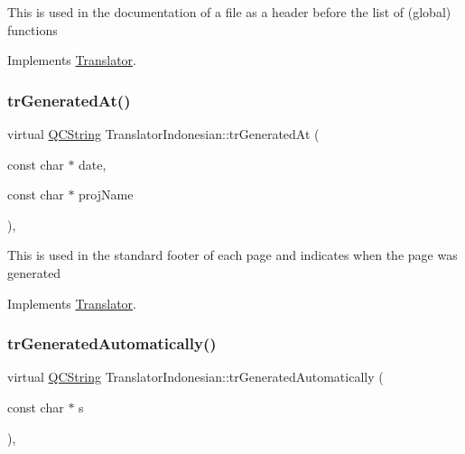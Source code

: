 This is used in the documentation of a file as a header before the list of (global) functions 

Implements \mbox{\hyperlink{class_translator}{Translator}}.

\mbox{\label{class_translator_indonesian_a027dd25383d2af18baa383e7cd5f08ab}} 
\subsubsection{\texorpdfstring{trGeneratedAt()}{trGeneratedAt()}}
{\footnotesize\ttfamily virtual \mbox{\hyperlink{class_q_c_string}{Q\+C\+String}} Translator\+Indonesian\+::tr\+Generated\+At (\begin{DoxyParamCaption}\item[{const char $\ast$}]{date,  }\item[{const char $\ast$}]{proj\+Name }\end{DoxyParamCaption})\hspace{0.3cm}{\ttfamily [inline]}, {\ttfamily [virtual]}}

This is used in the standard footer of each page and indicates when the page was generated 

Implements \mbox{\hyperlink{class_translator}{Translator}}.

\mbox{\label{class_translator_indonesian_a286ffd38a2fa13204faad4636952ad12}} 
\subsubsection{\texorpdfstring{trGeneratedAutomatically()}{trGeneratedAutomatically()}}
{\footnotesize\ttfamily virtual \mbox{\hyperlink{class_q_c_string}{Q\+C\+String}} Translator\+Indonesian\+::tr\+Generated\+Automatically (\begin{DoxyParamCaption}\item[{const char $\ast$}]{s }\end{DoxyParamCaption})\hspace{0.3cm}{\ttfamily [inline]}, {\ttfamily [virtual]}}

